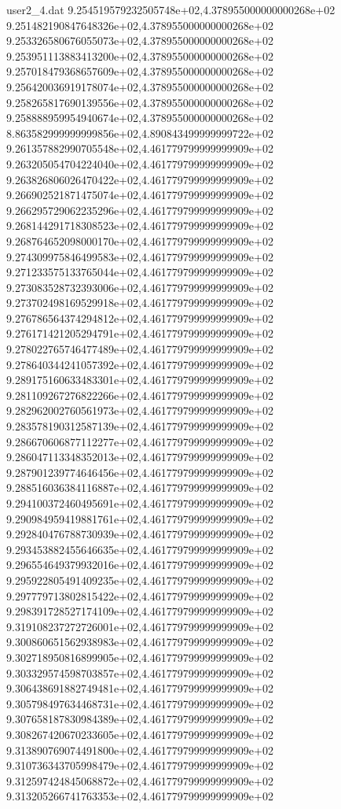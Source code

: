 \begin{filecontents}{user2_4.dat}
9.254519579232505748e+02,4.378955000000000268e+02
9.251482190847648326e+02,4.378955000000000268e+02
9.253326580676055073e+02,4.378955000000000268e+02
9.253951113883413200e+02,4.378955000000000268e+02
9.257018479368657609e+02,4.378955000000000268e+02
9.256420036919178074e+02,4.378955000000000268e+02
9.258265817690139556e+02,4.378955000000000268e+02
9.258888959954940674e+02,4.378955000000000268e+02
8.863582999999999856e+02,4.890843499999999722e+02
9.261357882990705548e+02,4.461779799999999909e+02
9.263205054704224040e+02,4.461779799999999909e+02
9.263826806026470422e+02,4.461779799999999909e+02
9.266902521871475074e+02,4.461779799999999909e+02
9.266295729062235296e+02,4.461779799999999909e+02
9.268144291718308523e+02,4.461779799999999909e+02
9.268764652098000170e+02,4.461779799999999909e+02
9.274309975846499583e+02,4.461779799999999909e+02
9.271233575133765044e+02,4.461779799999999909e+02
9.273083528732393006e+02,4.461779799999999909e+02
9.273702498169529918e+02,4.461779799999999909e+02
9.276786564374294812e+02,4.461779799999999909e+02
9.276171421205294791e+02,4.461779799999999909e+02
9.278022765746477489e+02,4.461779799999999909e+02
9.278640344241057392e+02,4.461779799999999909e+02
9.289175160633483301e+02,4.461779799999999909e+02
9.281109267276822266e+02,4.461779799999999909e+02
9.282962002760561973e+02,4.461779799999999909e+02
9.283578190312587139e+02,4.461779799999999909e+02
9.286670606877112277e+02,4.461779799999999909e+02
9.286047113348352013e+02,4.461779799999999909e+02
9.287901239774646456e+02,4.461779799999999909e+02
9.288516036384116887e+02,4.461779799999999909e+02
9.294100372460495691e+02,4.461779799999999909e+02
9.290984959419881761e+02,4.461779799999999909e+02
9.292840476788730939e+02,4.461779799999999909e+02
9.293453882455646635e+02,4.461779799999999909e+02
9.296554649379932016e+02,4.461779799999999909e+02
9.295922805491409235e+02,4.461779799999999909e+02
9.297779713802815422e+02,4.461779799999999909e+02
9.298391728527174109e+02,4.461779799999999909e+02
9.319108237272726001e+02,4.461779799999999909e+02
9.300860651562938983e+02,4.461779799999999909e+02
9.302718950816899905e+02,4.461779799999999909e+02
9.303329574598703857e+02,4.461779799999999909e+02
9.306438691882749481e+02,4.461779799999999909e+02
9.305798497634468731e+02,4.461779799999999909e+02
9.307658187830984389e+02,4.461779799999999909e+02
9.308267420670233605e+02,4.461779799999999909e+02
9.313890769074491800e+02,4.461779799999999909e+02
9.310736343705998479e+02,4.461779799999999909e+02
9.312597424845068872e+02,4.461779799999999909e+02
9.313205266741763353e+02,4.461779799999999909e+02

\end{filecontents}

